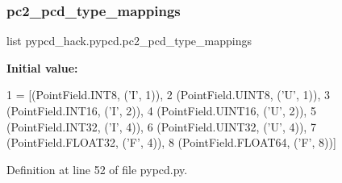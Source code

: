 \mbox{\label{namespacepypcd__hack_1_1pypcd_a4319d5aca601de59a3bbb4d3d53010b6}} 
\subsubsection{\texorpdfstring{pc2\+\_\+pcd\+\_\+type\+\_\+mappings}{pc2\_pcd\_type\_mappings}}
{\footnotesize\ttfamily list pypcd\+\_\+hack.\+pypcd.\+pc2\+\_\+pcd\+\_\+type\+\_\+mappings}

{\bfseries Initial value\+:}
\begin{DoxyCode}
1 =  [(PointField.INT8, (\textcolor{stringliteral}{'I'}, 1)),
2                              (PointField.UINT8, (\textcolor{stringliteral}{'U', 1)),}
3 \textcolor{stringliteral}{                             (PointField.INT16, ('I'}, 2)),
4                              (PointField.UINT16, (\textcolor{stringliteral}{'U', 2)),}
5 \textcolor{stringliteral}{                             (PointField.INT32, ('I'}, 4)),
6                              (PointField.UINT32, (\textcolor{stringliteral}{'U', 4)),}
7 \textcolor{stringliteral}{                             (PointField.FLOAT32, ('F'}, 4)),
8                              (PointField.FLOAT64, (\textcolor{stringliteral}{'F'}, 8))]
\end{DoxyCode}


Definition at line 52 of file pypcd.\+py.

